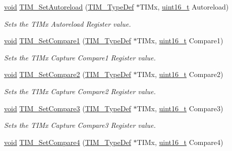 \begin{DoxyCompactItemize}
\hyperlink{usb__devapi_8h_afabf60e7f57651d6d595a02c75f07cd0}{void} \hyperlink{group___t_i_m___exported___functions_ga7880e4c00002d6421f9059a2ed841d5c}{T\+I\+M\+\_\+\+Set\+Autoreload} (\hyperlink{struct_t_i_m___type_def}{T\+I\+M\+\_\+\+Type\+Def} $\ast$T\+I\+Mx, \hyperlink{_p_e___types_8h_a1f1825b69244eb3ad2c7165ddc99c956}{uint16\+\_\+t} Autoreload)
\begin{DoxyCompactList}\small\item\em Sets the T\+I\+Mx Autoreload Register value. \end{DoxyCompactList}\item 
\hyperlink{usb__devapi_8h_afabf60e7f57651d6d595a02c75f07cd0}{void} \hyperlink{group___t_i_m___exported___functions_gab3a6031f187cb8af62eb09a67b4fd2ad}{T\+I\+M\+\_\+\+Set\+Compare1} (\hyperlink{struct_t_i_m___type_def}{T\+I\+M\+\_\+\+Type\+Def} $\ast$T\+I\+Mx, \hyperlink{_p_e___types_8h_a1f1825b69244eb3ad2c7165ddc99c956}{uint16\+\_\+t} Compare1)
\begin{DoxyCompactList}\small\item\em Sets the T\+I\+Mx Capture Compare1 Register value. \end{DoxyCompactList}\item 
\hyperlink{usb__devapi_8h_afabf60e7f57651d6d595a02c75f07cd0}{void} \hyperlink{group___t_i_m___exported___functions_ga0175ef4fabade443909002a63d4e9758}{T\+I\+M\+\_\+\+Set\+Compare2} (\hyperlink{struct_t_i_m___type_def}{T\+I\+M\+\_\+\+Type\+Def} $\ast$T\+I\+Mx, \hyperlink{_p_e___types_8h_a1f1825b69244eb3ad2c7165ddc99c956}{uint16\+\_\+t} Compare2)
\begin{DoxyCompactList}\small\item\em Sets the T\+I\+Mx Capture Compare2 Register value. \end{DoxyCompactList}\item 
\hyperlink{usb__devapi_8h_afabf60e7f57651d6d595a02c75f07cd0}{void} \hyperlink{group___t_i_m___exported___functions_ga416df50f4223351e366ae40a4ec163ae}{T\+I\+M\+\_\+\+Set\+Compare3} (\hyperlink{struct_t_i_m___type_def}{T\+I\+M\+\_\+\+Type\+Def} $\ast$T\+I\+Mx, \hyperlink{_p_e___types_8h_a1f1825b69244eb3ad2c7165ddc99c956}{uint16\+\_\+t} Compare3)
\begin{DoxyCompactList}\small\item\em Sets the T\+I\+Mx Capture Compare3 Register value. \end{DoxyCompactList}\item 
\hyperlink{usb__devapi_8h_afabf60e7f57651d6d595a02c75f07cd0}{void} \hyperlink{group___t_i_m___exported___functions_gaf428edf474804691d6f587e78c97a082}{T\+I\+M\+\_\+\+Set\+Compare4} (\hyperlink{struct_t_i_m___type_def}{T\+I\+M\+\_\+\+Type\+Def} $\ast$T\+I\+Mx, \hyperlink{_p_e___types_8h_a1f1825b69244eb3ad2c7165ddc99c956}{uint16\+\_\+t} Compare4)

\end{DoxyCompactItemize}
